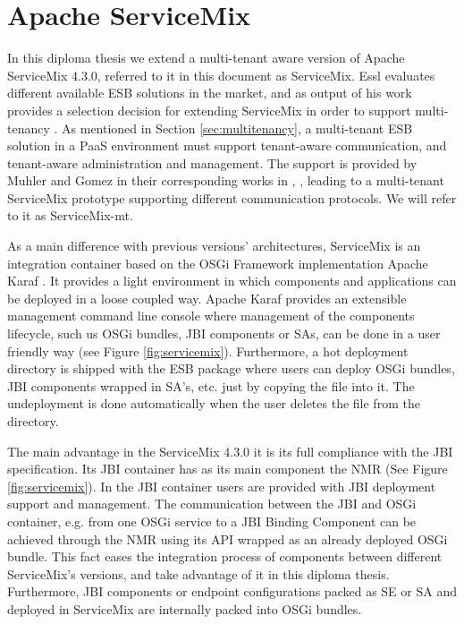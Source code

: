 \section{Apache ServiceMix}
\label{sec:servicemix}  

In this diploma thesis we extend a multi-tenant aware version of Apache ServiceMix 4.3.0, referred to it in this document as ServiceMix. Essl evaluates different available \ac{ESB} solutions in the market, and as output of his work provides a selection decision for extending ServiceMix in order to support multi-tenancy \cite{Essl2011}. As mentioned in Section \ref{sec:multitenancy}, a multi-tenant \ac{ESB} solution in a \ac{PaaS} environment must support tenant-aware communication, and tenant-aware administration and management. The support is provided by Muhler and Gomez in their corresponding works in \cite{Muhler2012}, \cite{gomez2012}, leading to a multi-tenant ServiceMix prototype supporting different communication protocols. We will refer to it as ServiceMix-mt.

As a main difference with previous versions' architectures, ServiceMix is an integration container based on the \ac{OSGi} Framework implementation Apache Karaf  \cite{Karaf2011}. It provides a light environment in which components and applications can be deployed in a loose coupled way. Apache Karaf provides an extensible management command line console where management of the components lifecycle, such us \ac{OSGi} bundles, \ac{JBI} components or \ac{SA}s, can be done in a user friendly way (see Figure \ref{fig:servicemix}). Furthermore, a hot deployment directory is shipped with the \ac{ESB} package where users can deploy \ac{OSGi} bundles, \ac{JBI} components wrapped in \ac{SA}'s, etc. just by copying the file into it. The undeployment is done automatically when the user deletes the file from the  directory. 

The main advantage in the ServiceMix 4.3.0 it is its full compliance with the \ac{JBI} specification. Its \ac{JBI} container has as its main component the \ac{NMR} (See Figure \ref{fig:servicemix}). In the \ac{JBI} container users are provided with \ac{JBI} deployment support and management. The communication between the \ac{JBI} and \ac{OSGi} container, e.g. from one \ac{OSGi} service to a \ac{JBI} Binding Component can be achieved through the \ac{NMR} using its API wrapped as an already deployed \ac{OSGi} bundle. This fact eases the integration process of components between different ServiceMix's versions, and take advantage of it in this diploma thesis. Furthermore, \ac{JBI} components or endpoint configurations packed as \ac{SE} or \ac{SA} and deployed in ServiceMix are internally packed into \ac{OSGi} bundles. 


